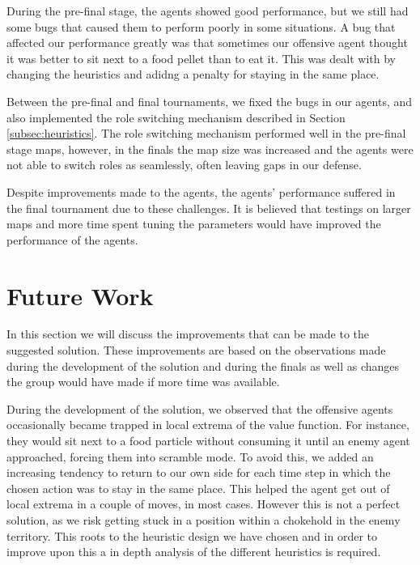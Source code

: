 \documentclass[a4paper,12pt]{article}
\begin{document}
During the pre-final stage, the agents showed good performance, but we still had some bugs that caused them to perform poorly in some situations. 
A bug that affected our performance greatly was that sometimes our offensive agent thought it was better to sit next to a food pellet than to eat it.
This was dealt with by changing the heuristics and adidng a penalty for staying in the same place.

Between the pre-final and final tournaments, we fixed the bugs in our agents, and also implemented the role switching mechanism described in Section \ref{subsec:heuristics}.
The role switching mechanism performed well in the pre-final stage maps, however, in the finals the map size was increased and the agents were not able to switch roles as seamlessly, often leaving gaps in our defense.

Despite improvements made to the agents, the agents' performance suffered in the final tournament due to these challenges. It is believed that testings on larger maps and more time spent tuning the parameters would have improved the performance of the agents.

















\section{Future Work}
\label{subsec:Future work}
In this section we will discuss the improvements that can be made to the suggested solution. 
These improvements are based on the observations made during the development of the solution and during the finals as well as changes the group would have made if more time was available.

During the development of the solution, we observed that the offensive agents occasionally became trapped in local extrema of the value function. For instance, they would sit next to a food particle without consuming it until an enemy agent approached, forcing them into scramble mode.
To avoid this, we added an increasing tendency to return to our own side for each time step in which the chosen action was to stay in the same place. 
This helped the agent get out of local extrema in a couple of moves, in most cases. 
However this is not a perfect solution, as we risk getting stuck in a position within a chokehold in the enemy territory. This roots to the heuristic design we have chosen and in order to improve upon this a in depth analysis of the different heuristics is required.
\end{document}
